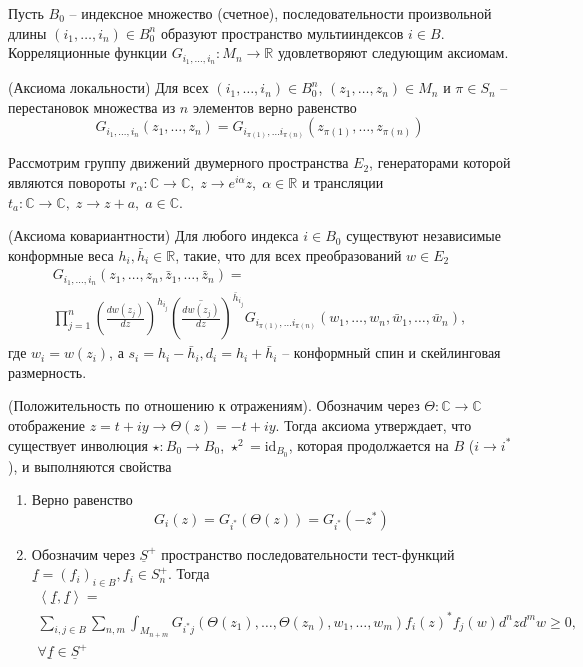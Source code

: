   Пусть $B_{0}$ -- индексное множество (счетное), последовательности произвольной длины $(i_{1},\dots,i_{n})\in B_{0}^{n}$ образуют пространство мультииндексов $i\in B$.  Корреляционные функции $G_{i_{1},\dots, i_{n}}:M_{n}\to \mathbb{R}$ удовлетворяют следующим аксиомам.
\begin{axiom}
  (Аксиома локальности)
  Для всех $(i_{1},\dots,i_{n})\in B_{0}^{n}$, $(z_{1},\dots, z_{n})\in M_{n}$ и $\pi\in S_{n}$ -- перестановок множества из $n$ элементов верно равенство
  \begin{equation}
    \label{eq:51}
    G_{i_{1},\dots,i_{n}}(z_{1},\dots,z_{n})=G_{i_{\pi(1)},\dots i_{\pi(n)}}(z_{\pi(1)},\dots, z_{\pi(n)})
  \end{equation}
\end{axiom}
Рассмотрим группу движений двумерного пространства $E_{2}$, генераторами которой являются повороты $r_{\alpha}:\mathbb{C}\to\mathbb{C}, \; z\to e^{i\alpha}z,\; \alpha\in \mathbb{R}$ и трансляции $t_{a}:\mathbb{C}\to\mathbb{C},\; z\to z+a,\; a\in\mathbb{C}$. 
\begin{axiom}
  (Аксиома ковариантности)
  Для любого индекса $i\in B_{0}$  существуют независимые конформные веса $h_{i},\bar h_{i}\in \mathbb{R}$, такие, что для всех преобразований $w\in E_{2}$
  \begin{multline}
    \label{eq:52}
    G_{i_{1},\dots,i_{n}}(z_{1},\dots,z_{n},\bar z_{1},\dots, \bar z_{n})=\\
\prod_{j=1}^{n}\left(\frac{dw(z_{j})}{dz}\right)^{h_{i_{j}}}\left(\overline{\frac{dw(z_{j})}{dz}}\right)^{\bar{h}_{i_{j}}} G_{i_{\pi(1)},\dots i_{\pi(n)}}(w_{1},\dots, w_{n},\bar w_{1},\dots,\bar w_{n}),
  \end{multline}
где $w_{i}=w(z_{i})$, а $s_{i}=h_{i}-\bar h_{i}, d_{i}=h_{i}+\bar h_{i}$  -- конформный спин и скейлинговая размерность.
\end{axiom}
\begin{axiom}
  (Положительность по отношению к отражениям).
  Обозначим через $\Theta:\mathbb{C}\to\mathbb{C}$  отображение $z=t+i y\to \Theta(z)= -t+i y$. Тогда аксиома утверждает, что существует инволюция $\star:B_{0}\to B_{0}$, $\star^{2}=\mathrm{id}_{B_{0}}$, которая продолжается на $B$ ($i\to i^{*}$), и выполняются свойства
  \begin{enumerate}
  \item Верно равенство
    \begin{equation}
      \label{eq:53}
      G_{i}(z)=G_{i^{*}}(\Theta(z))=G_{i^{*}}(-z^{*})
    \end{equation}
  \item Обозначим через $\underline{S}^{+}$ пространство последовательности тест-функций $\underline{f}=(f_{i})_{i\in B}, f_{i}\in S^{+}_{n}$. Тогда
    \begin{multline}
      \label{eq:54}
      \left<\underline{f},\underline{f}\right>=\\
      \sum_{i,j\in B}\sum_{n,m}\int_{M_{n+m}}G_{i^{*} j}(\Theta(z_{1}),\dots ,\Theta(z_{n}),w_{1},\dots,w_{m}) f_{i}(z)^{*}f_{j}(w) d^{n}z d^{m}w 
      \geq 0,\\ \forall \underline{f}\in \underline{S}^{+}
    \end{multline}
  \end{enumerate}
\end{axiom}

